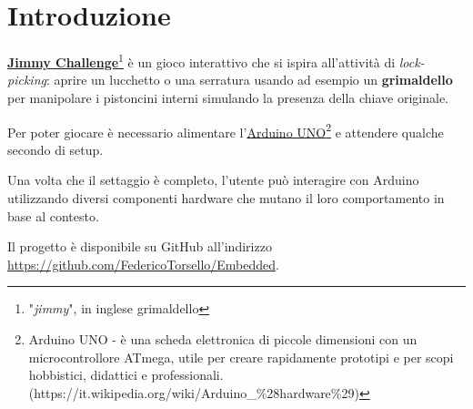 \chapter{Introduzione}
\href{https://github.com/FedericoTorsello/Embedded/tree/arduino}{\textbf{Jimmy Challenge}}\footnote{"\textit{jimmy}", in inglese grimaldello} è un gioco interattivo che si ispira all'attività di \textit{lock-picking}: aprire un lucchetto o una serratura usando ad esempio un \textbf{grimaldello} per manipolare i pistoncini interni simulando la presenza della chiave originale.

Per poter giocare è necessario alimentare l'\href{https://www.arduino.cc/en/Main/ArduinoBoardUno}{Arduino UNO\footnote{Arduino UNO - è una scheda elettronica di piccole dimensioni con un microcontrollore ATmega, utile per creare rapidamente prototipi e per scopi hobbistici, didattici e professionali. (\url{https://it.wikipedia.org/wiki/Arduino\_\%28hardware\%29})}} e attendere qualche secondo di setup.

Una volta che il settaggio è completo, l'utente può interagire con Arduino utilizzando diversi componenti hardware che mutano il loro comportamento in base al contesto.

Il progetto è disponibile su GitHub all'indirizzo \\\url{https://github.com/FedericoTorsello/Embedded}.